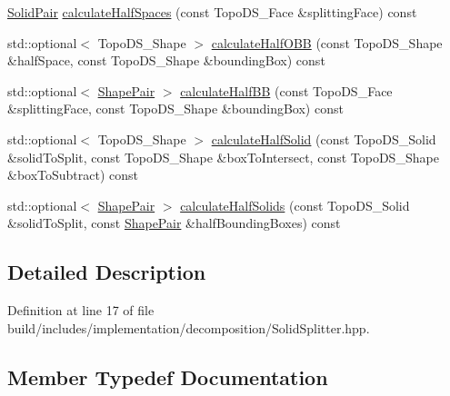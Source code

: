 \begin{DoxyCompactItemize}
\item 
\hyperlink{classMcCAD_1_1Decomposition_1_1SolidSplitter_a89a95e43f161348b456a72c9acce0826}{Solid\+Pair} \hyperlink{classMcCAD_1_1Decomposition_1_1SolidSplitter_acf1e0b4909357eb0fa1ea6aaa260378d}{calculate\+Half\+Spaces} (const Topo\+D\+S\+\_\+\+Face \&splitting\+Face) const
\item 
std\+::optional$<$ Topo\+D\+S\+\_\+\+Shape $>$ \hyperlink{classMcCAD_1_1Decomposition_1_1SolidSplitter_affe2290ed883ce0e08b09a379443aa6a}{calculate\+Half\+O\+BB} (const Topo\+D\+S\+\_\+\+Shape \&half\+Space, const Topo\+D\+S\+\_\+\+Shape \&bounding\+Box) const
\item 
std\+::optional$<$ \hyperlink{classMcCAD_1_1Decomposition_1_1SolidSplitter_a6d92618f3790cfc7403c6f421bd66411}{Shape\+Pair} $>$ \hyperlink{classMcCAD_1_1Decomposition_1_1SolidSplitter_af799d68c9e95e188e15b435713a11d31}{calculate\+Half\+BB} (const Topo\+D\+S\+\_\+\+Face \&splitting\+Face, const Topo\+D\+S\+\_\+\+Shape \&bounding\+Box) const
\item 
std\+::optional$<$ Topo\+D\+S\+\_\+\+Shape $>$ \hyperlink{classMcCAD_1_1Decomposition_1_1SolidSplitter_a75c73265fa39797edb0d2b298192d193}{calculate\+Half\+Solid} (const Topo\+D\+S\+\_\+\+Solid \&solid\+To\+Split, const Topo\+D\+S\+\_\+\+Shape \&box\+To\+Intersect, const Topo\+D\+S\+\_\+\+Shape \&box\+To\+Subtract) const
\item 
std\+::optional$<$ \hyperlink{classMcCAD_1_1Decomposition_1_1SolidSplitter_a6d92618f3790cfc7403c6f421bd66411}{Shape\+Pair} $>$ \hyperlink{classMcCAD_1_1Decomposition_1_1SolidSplitter_aa46ed151e82f31710667cc420225ca7c}{calculate\+Half\+Solids} (const Topo\+D\+S\+\_\+\+Solid \&solid\+To\+Split, const \hyperlink{classMcCAD_1_1Decomposition_1_1SolidSplitter_a6d92618f3790cfc7403c6f421bd66411}{Shape\+Pair} \&half\+Bounding\+Boxes) const
\end{DoxyCompactItemize}


\subsection{Detailed Description}


Definition at line 17 of file build/includes/implementation/decomposition/\+Solid\+Splitter.\+hpp.



\subsection{Member Typedef Documentation}
\mbox{\label{classMcCAD_1_1Decomposition_1_1SolidSplitter_af1bd2cdc22fc3e59277ea6fd04afc42b}} 
